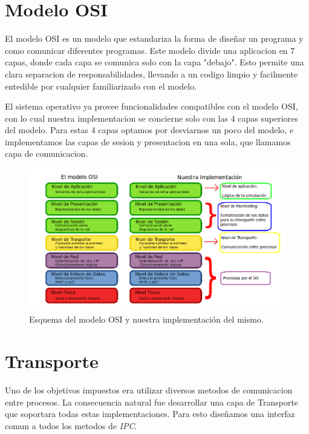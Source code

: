 \documentclass[a4paper,10pt]{article}
\begin{document}
\section{Modelo OSI}

El modelo OSI es un modelo que estandariza la forma de diseñar un programa y como comunicar diferentes programas. 
Este modelo divide una aplicacion en 7 capas, donde cada capa se comunica solo con la capa "debajo".
Esto permite una clara separacion de responsabilidades, llevando a un codigo limpio y facilmente entedible por cualquier familiarizado con el modelo.

El sistema operativo ya provee funcionalidades compatibles con el modelo OSI, con lo cual nuestra implementacion se concierne solo con las 4 capas superiores del modelo.
Para estas 4 capas optamos por desviarnos un poco del modelo, e implementamos las capas de sesion y presentacion en una sola, que llamamos capa de comunicacion.

\begin{figure}[H]
\begin{center}
 \includegraphics[scale=0.5]{./images/modelo-osi_nuestro.png}
 \caption{Esquema del modelo OSI y nuestra implementación del mismo.}
\end{center}
\end{figure}


\newpage
\section{Transporte}
Uno de los objetivos impuestos era utilizar diversos metodos de comunicacion entre procesos.
La consecuencia natural fue desarrollar una capa de Transporte que soportara todas estas implementaciones.
Para esto diseñamos una interfaz comun a todos los metodos de \textit{IPC}.
\end{document}
